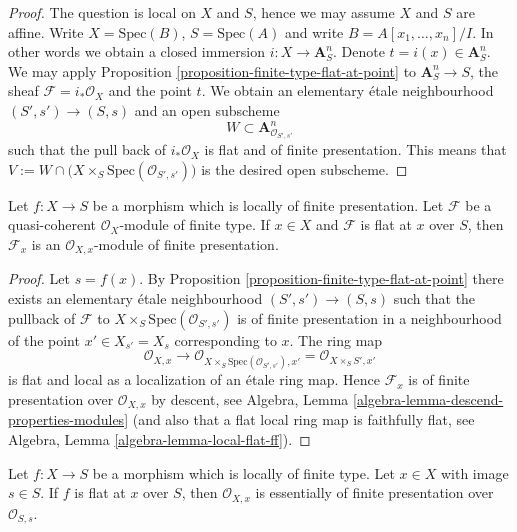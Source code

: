 \begin{proof}
The question is local on $X$ and $S$, hence we may assume $X$ and $S$
are affine. Write $X = \text{Spec}(B)$, $S = \text{Spec}(A)$ and write
$B = A[x_1, \ldots, x_n]/I$. In other words we obtain a closed immersion
$i : X \to \mathbf{A}^n_S$. Denote $t = i(x) \in \mathbf{A}^n_S$.
We may apply
Proposition \ref{proposition-finite-type-flat-at-point}
to $\mathbf{A}^n_S \to S$, the sheaf $\mathcal{F} = i_*\mathcal{O}_X$
and the point $t$. We obtain an elementary
\'etale neighbourhood $(S', s') \to (S, s)$ and an open subscheme
$$
W \subset \mathbf{A}^n_{\mathcal{O}_{S', s'}}
$$
such that the pull back of $i_*\mathcal{O}_X$ is flat and of finite
presentation. This means that
$V := W \cap \big(X \times_S \text{Spec}(\mathcal{O}_{S', s'})\big)$
is the desired open subscheme.
\end{proof}

\begin{lemma}
\label{lemma-finite-type-flat-at-point-local}
Let $f : X \to S$ be a morphism which is locally of finite presentation.
Let $\mathcal{F}$ be a quasi-coherent $\mathcal{O}_X$-module of finite type.
If $x \in X$ and $\mathcal{F}$ is flat at $x$ over $S$, then
$\mathcal{F}_x$ is an $\mathcal{O}_{X, x}$-module of finite presentation.
\end{lemma}

\begin{proof}
Let $s = f(x)$. By
Proposition \ref{proposition-finite-type-flat-at-point}
there exists an elementary \'etale neighbourhood $(S', s') \to (S, s)$
such that the pullback of $\mathcal{F}$ to
$X \times_S \text{Spec}(\mathcal{O}_{S', s'})$ is of
finite presentation in a neighbourhood of the point $x' \in X_{s'} = X_s$
corresponding to $x$. The ring map
$$
\mathcal{O}_{X, x} \longrightarrow
\mathcal{O}_{X \times_S \text{Spec}(\mathcal{O}_{S', s'}), x'}
=
\mathcal{O}_{X \times_S S', x'}
$$
is flat and local as a localization of an \'etale ring map. Hence
$\mathcal{F}_x$ is of finite presentation over $\mathcal{O}_{X, x}$
by descent, see
Algebra, Lemma \ref{algebra-lemma-descend-properties-modules}
(and also that a flat local ring map is faithfully flat, see
Algebra, Lemma \ref{algebra-lemma-local-flat-ff}).
\end{proof}

\begin{lemma}
\label{lemma-finite-type-flat-at-point-local-X}
Let $f : X \to S$ be a morphism which is locally of finite type.
Let $x \in X$ with image $s \in S$. If $f$ is flat at $x$ over $S$, then
$\mathcal{O}_{X, x}$ is essentially of finite presentation over
$\mathcal{O}_{S, s}$.
\end{lemma}

